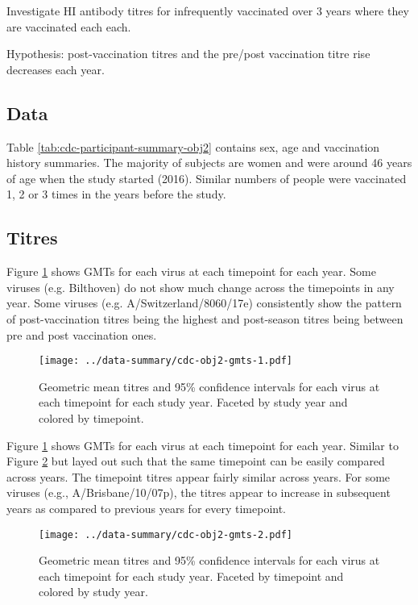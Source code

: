 \documentclass[12pt]{article}
\begin{document}
Investigate HI antibody titres for infrequently vaccinated over 3 years where
they are vaccinated each each.

Hypothesis: post-vaccination titres and the pre/post vaccination titre rise
decreases each year.

\subsection{Data}

Table \ref{tab:cdc-participant-summary-obj2} contains sex, age and
vaccination history summaries.
The majority of subjects are
women and were around 46 years of age when the study started (2016).
Similar numbers of people were vaccinated 1, 2 or 3 times in the years before
the study.



\subsection{Titres}

Figure \ref{fig:cdc-obj2-gmts-1} shows GMTs for each virus at each timepoint for each year.
Some viruses (e.g. Bilthoven) do not show much change across the timepoints in
any year. Some viruses (e.g. A/Switzerland/8060/17e) consistently show the pattern of post-vaccination titres being the highest and post-season titres being between pre and post vaccination ones.

\begin{figure}
	\texttt{[image: ../data-summary/cdc-obj2-gmts-1.pdf]}
	\caption{Geometric mean titres and 95\% confidence intervals for each virus at each timepoint for each study year. Faceted by study year and colored by timepoint.}
	\label{fig:cdc-obj2-gmts-1}
\end{figure}

Figure \ref{fig:cdc-obj2-gmts-1} shows GMTs for each virus at each timepoint for each year. Similar to Figure \ref{fig:cdc-obj2-gmts-2} but layed out such that the same timepoint can be easily compared across years. The timepoint titres appear fairly similar across years. For some viruses (e.g., A/Brisbane/10/07p), the titres appear to increase in subsequent years as compared to previous years for every timepoint.

\begin{figure}
	\texttt{[image: ../data-summary/cdc-obj2-gmts-2.pdf]}
	\caption{Geometric mean titres and 95\% confidence intervals for each virus at each timepoint for each study year. Faceted by timepoint and colored by study year.}
	\label{fig:cdc-obj2-gmts-2}
\end{figure}
\end{document}

